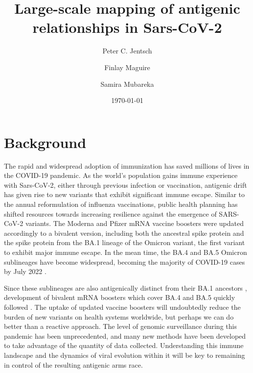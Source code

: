 \documentclass{article}
\title{Large-scale mapping of antigenic relationships in Sars-CoV-2}
\author[1,4]{Peter C. Jentsch}
\author[3,5]{Finlay Maguire}
\author[1,2]{Samira Mubareka}
\affil[1]{Sunnybrook Research Institute, Toronto, Canada}
\affil[2]{University of Toronto, Toronto, Canada}
\affil[3]{Dalhousie University, Halifax, Canada}
\affil[4]{Simon Fraser University, Burnaby, Canada}
\affil[5]{Shared Hospital Laboratory, Toronto, Canada}
\date{\today}
\begin{document}
\maketitle

\section{Background}

The rapid and widespread adoption of immunization has saved millions of lives in the COVID-19 pandemic.
As the world's population gains immune experience with Sars-CoV-2, either through previous infection or vaccination, antigenic drift has given rise to new variants that exhibit significant immune escape\cite{yewdellAntigenicDriftUnderstanding2021}.
Similar to the annual reformulation of influenza vaccinations, public health planning has shifted resources towards increasing resilience against the emergence of SARS-CoV-2 variants.
The Moderna and Pfizer mRNA vaccine boosters were updated accordingly to a bivalent version, including both the ancestral spike protein and the spike protein from the BA.1 lineage of the Omicron variant, the first variant to exhibit major immune escape.
In the mean time, the BA.4 and BA.5 Omicron sublineages have become widespread, becoming the majority of COVID-19 cases by July 2022 \cite{wilhelm2022early}.

Since these sublineages are also antigenically distinct from their BA.1 ancestors \cite{cao2022ba}, development of bivalent mRNA boosters which cover BA.4 and BA.5 quickly followed \cite{chalkias2022bivalent}.
The uptake of updated vaccine boosters will undoubtedly reduce the burden of new variants on health systems worldwide, but perhaps we can do better than a reactive approach.
The level of genomic surveillance during this pandemic has been unprecedented, and many new methods have been developed to take advantage of the quantity of data collected.
Understanding this immune landscape and the dynamics of viral evolution within it will be key to remaining in control of the resulting antigenic arms race.
\end{document}
